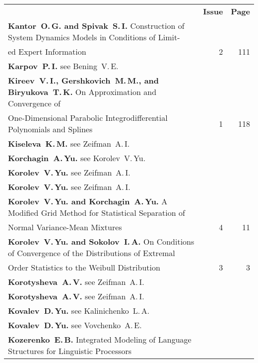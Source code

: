 {\tabcolsep=3pt
\begin{tabular}{p{397pt}rr}
&\textbf{Issue} & \textbf{Page}\\[6pt]
\textbf{Kantor~O.\,G. and Spivak~S.\,I.} Construction of System Dynamics Models in
Conditions of Limit-\linebreak
\vspace*{-12pt}\\
\hspace*{23pt}ed Expert Information\dotfill&2&111\\
\textbf{Karpov~P.\,I.} see Bening~V.\,E.&&\\
\textbf{Kireev~V.\,I., Gershkovich~M.\,M., and Biryukova~T.\,K.} On Approximation and
Convergence of\linebreak
\vspace*{-12pt}\\
\hspace*{23pt}One-Dimensional Parabolic Integrodifferential Polynomials and
Splines\dotfill&1&118\\
\textbf{Kiseleva~K.\,M.} see Zeifman~A.\,I.&&\\
\textbf{Korchagin~A.\,Yu.} see Korolev~V.\,Yu.&&\\
\textbf{Korolev~V.\,Yu.} see Zeifman~A.\,I.&&\\
\textbf{Korolev~V.\,Yu.} see Zeifman~A.\,I.&&\\
\textbf{Korolev~V.\,Yu. and Korchagin~A.\,Yu.} A Modified Grid Method for Statistical
Separation of\linebreak
\vspace*{-12pt}\\
\hspace*{23pt}Normal Variance-Mean Mixtures\dotfill&4&11\\
\textbf{Korolev~V.\,Yu. and Sokolov~I.\,A.} On Conditions of Convergence of the Distributions
of Extremal\linebreak
\vspace*{-12pt}\\
\hspace*{23pt}Order Statistics to the Weibull Distribution\dotfill&3&3\\
\textbf{Korotysheva~A.\,V.} see Zeifman~A.\,I.&&\\
\textbf{Korotysheva~A.\,V.} see Zeifman~A.\,I.&&\\
\textbf{Kovalev~D.\,Yu.} see Kalinichenko~L.\,A.&&\\
\textbf{Kovalev~D.\,Yu.} see Vovchenko~A.\,E.&&\\
\textbf{Kozerenko~E.\,B.} Integrated Modeling of Language Structures for Linguistic Processors

\end{tabular}}
